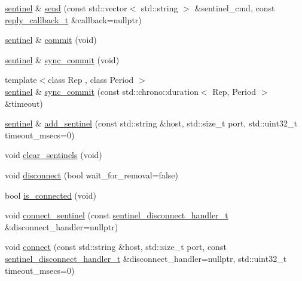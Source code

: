 \begin{DoxyCompactItemize}
\mbox{\hyperlink{classcpp__redis_1_1sentinel}{sentinel}} \& \mbox{\hyperlink{classcpp__redis_1_1sentinel_a0df522dbd7debda4e73f616a62d6f5ee}{send}} (const std\+::vector$<$ std\+::string $>$ \&sentinel\+\_\+cmd, const \mbox{\hyperlink{classcpp__redis_1_1sentinel_ae1a150ff8787208c47414397a061c9a7}{reply\+\_\+callback\+\_\+t}} \&callback=nullptr)
\item 
\mbox{\hyperlink{classcpp__redis_1_1sentinel}{sentinel}} \& \mbox{\hyperlink{classcpp__redis_1_1sentinel_ad4f85d486499f82225b244f85091b31e}{commit}} (void)
\item 
\mbox{\hyperlink{classcpp__redis_1_1sentinel}{sentinel}} \& \mbox{\hyperlink{classcpp__redis_1_1sentinel_a8e4d231ac89510c337fe97fe9e642785}{sync\+\_\+commit}} (void)
\item 
{\footnotesize template$<$class Rep , class Period $>$ }\\\mbox{\hyperlink{classcpp__redis_1_1sentinel}{sentinel}} \& \mbox{\hyperlink{classcpp__redis_1_1sentinel_afbaa0b80266f70ad98c0bf8f28c533ab}{sync\+\_\+commit}} (const std\+::chrono\+::duration$<$ Rep, Period $>$ \&timeout)
\item 
\mbox{\hyperlink{classcpp__redis_1_1sentinel}{sentinel}} \& \mbox{\hyperlink{classcpp__redis_1_1sentinel_a6c846b71478c330d2cad7aa662dfd681}{add\+\_\+sentinel}} (const std\+::string \&host, std\+::size\+\_\+t port, std\+::uint32\+\_\+t timeout\+\_\+msecs=0)
\item 
void \mbox{\hyperlink{classcpp__redis_1_1sentinel_ac36640b3f392970c72f5a513a2d61ac7}{clear\+\_\+sentinels}} (void)
\item 
void \mbox{\hyperlink{classcpp__redis_1_1sentinel_af607d8c5a20ada35daad251f1b1b2f68}{disconnect}} (bool wait\+\_\+for\+\_\+removal=false)
\item 
bool \mbox{\hyperlink{classcpp__redis_1_1sentinel_aa98a0593e6e7c04d8d0dd1f292cdce47}{is\+\_\+connected}} (void)
\item 
void \mbox{\hyperlink{classcpp__redis_1_1sentinel_a82c8cb23efab71ff00cf2277bba91e90}{connect\+\_\+sentinel}} (const \mbox{\hyperlink{classcpp__redis_1_1sentinel_a923e06b5b700c16dffec8a01d2fa9aa4}{sentinel\+\_\+disconnect\+\_\+handler\+\_\+t}} \&disconnect\+\_\+handler=nullptr)
\item 
void \mbox{\hyperlink{classcpp__redis_1_1sentinel_a1dfba8240daf7cfa7502f57957cffbda}{connect}} (const std\+::string \&host, std\+::size\+\_\+t port, const \mbox{\hyperlink{classcpp__redis_1_1sentinel_a923e06b5b700c16dffec8a01d2fa9aa4}{sentinel\+\_\+disconnect\+\_\+handler\+\_\+t}} \&disconnect\+\_\+handler=nullptr, std\+::uint32\+\_\+t timeout\+\_\+msecs=0)

\end{DoxyCompactItemize}
